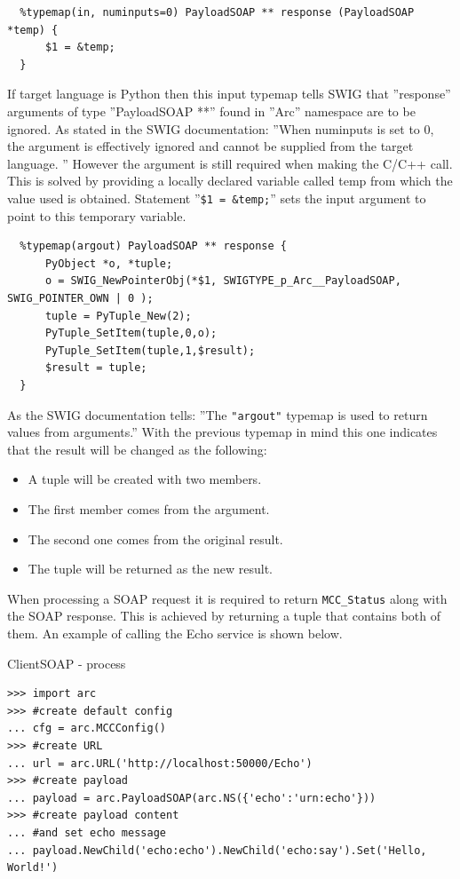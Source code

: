 \documentclass{article}
\begin{document}
\begin{flushleft}
\begin{itemize}
{\begin{verbatim}
  %typemap(in, numinputs=0) PayloadSOAP ** response (PayloadSOAP *temp) {
      $1 = &temp;
  }
  \end{verbatim}
  If target language is Python then this input typemap tells SWIG that ''response'' 
  arguments of type ''PayloadSOAP **'' found in ''Arc'' namespace are to be ignored. 
  As stated in the SWIG documentation: ''When numinputs is set to 0, the argument is 
  effectively ignored and cannot be supplied from the target language. '' 
  However the argument is still required when making the C/C++ call. This is solved 
  by providing a locally declared variable called temp from which the value used is 
  obtained. Statement ''\verb#$1 = &temp;#'' sets the input argument to point to this 
  temporary variable.
  \begin{verbatim}
  %typemap(argout) PayloadSOAP ** response {
      PyObject *o, *tuple;
      o = SWIG_NewPointerObj(*$1, SWIGTYPE_p_Arc__PayloadSOAP, SWIG_POINTER_OWN | 0 );
      tuple = PyTuple_New(2);
      PyTuple_SetItem(tuple,0,o);
      PyTuple_SetItem(tuple,1,$result);
      $result = tuple;
  }
  \end{verbatim}
  As the SWIG documentation tells: ''The \verb$"argout"$ typemap is used to return values from arguments.''
  With the previous typemap in mind this one indicates that the result will be changed as the following:
    \begin{itemize}
    \item{
      A tuple will be created with two members.
    }
    \item{
      The first member comes from the argument.
    }
    \item{
      The second one comes from the original result.
    }
    \item{
      The tuple will be returned as the new result.
    }
    \end{itemize}
  When processing a SOAP request it is required to return \verb$MCC_Status$ along with
  the SOAP response. This is achieved by returning a tuple that contains both of them.
  An example of calling the Echo service is shown below.
    \begin{example}
      \caption{ClientSOAP - process}\label{procex}
\begin{verbatim}
>>> import arc
>>> #create default config
... cfg = arc.MCCConfig()
>>> #create URL
... url = arc.URL('http://localhost:50000/Echo')
>>> #create payload
... payload = arc.PayloadSOAP(arc.NS({'echo':'urn:echo'}))
>>> #create payload content
... #and set echo message
... payload.NewChild('echo:echo').NewChild('echo:say').Set('Hello, World!')

\end{verbatim}
\end{example}}
\end{itemize}
\end{flushleft}
\end{document}
